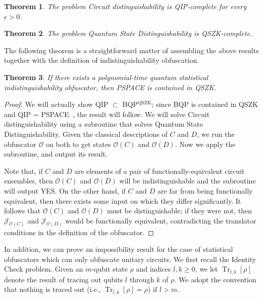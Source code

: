 \documentclass[11pt]{article}
\DeclareMathOperator{\tr}{Tr}
\numberwithin{equation}{section}
\newtheorem{theorem}{Theorem}
\newcommand{\algo}{\mathcal}
\begin{document}
{\begin{theorem}\label{thm:QCD}
\emph{\cite{RW05}} The problem \textsf{\emph{Circuit distinguishability}} is QIP-complete for every $\epsilon > 0$. 
\end{theorem}

\begin{theorem}\label{thm:QSD}
\emph{\cite{Watrous02}} The problem \textsf{\emph{Quantum State Distinguishability}} is QSZK-complete.
\end{theorem}

The following theorem is a straightforward matter of assembling the above results together with the definition of indistinguishability obfuscation.

\begin{theorem}
If there exists a polynomial-time quantum statistical indistinguishability obfuscator, then PSPACE is contained in QSZK.
\end{theorem}
\begin{proof}
We will actually show QIP $\subset$ BQP$^{\text{QSZK}}$; since BQP is contained in QSZK and QIP = PSPACE~\cite{JJUW10}, the result will follow. We will solve \textsf{Circuit distinguishability} using a subroutine that solves \textsf{Quantum State Distinguishability}. Given the classical descriptions of $C$ and $D$, we run the obfuscator $\algo O$ on both to get states $\algo O(C)$ and $\algo O(D)$. Now we apply the subroutine, and output its result.

Note that, if $C$ and $D$ are elements of a pair of functionally-equivalent circuit ensembles, then $\algo O(C)$ and $\algo O(D)$ will be indistinguishable and the subroutine will output YES. On the other hand, if $C$ and $D$ are far from being functionally equivalent, then there exists some input on which they differ significantly. It follows that $\algo O(C)$ and $\algo O(D)$ must be distinguishable; if they were not, then $\algo J_{\algo O(C)}$ and $\algo J_{\algo O(D)}$ would be functionally equivalent, contradicting the translator conditions in the definition of the obfuscator.
\end{proof}

In addition, we can prove an impossibility result for the case of statistical obfuscators which can only obfuscate unitary circuits. We first recall the \textsf{Identity Check} problem. Given an $m$-qubit state $\rho$ and indices $l, k \geq 0$, we let $\tr_{l,k} [\rho]$ denote the result of tracing out qubits $l$ through $k$ of $\rho$. We adopt the convention that nothing is traced out (i.e., $\tr_{l,k}[\rho] = \rho$) if $l > m$.

}
\end{document}
